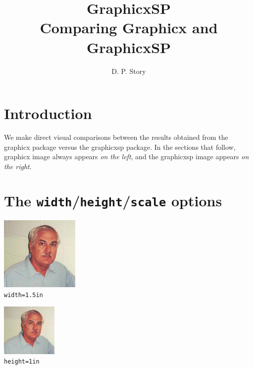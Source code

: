 \documentclass{article}
\title{\textsf{GraphicxSP}\\Comparing \textsf{Graphicx} and \textsf{GraphicxSP}}
\author{D. P. Story}
\begin{document}
\maketitle

\section{Introduction}

We make direct visual comparisons between the results obtained from the
\textsf{graphicx} package versus the \textsf{graphicxsp} package. In the sections
that follow, \textsf{graphicx} image always appears \emph{on the left}, and the
\textsf{graphicxsp} image appears \emph{on the right}.

\section{The \texttt{width}/\texttt{height}/\texttt{scale} options}

\begin{center}
\includegraphics[width=1.5in]{graphics/AdobeDon}
\\[1ex]
\texttt{width=1.5in}
\end{center}

\begin{center}
\includegraphics[height=1in]{graphics/AdobeDon}
\\[1ex]
        \texttt{height=1in}
\end{center}
\end{document}
